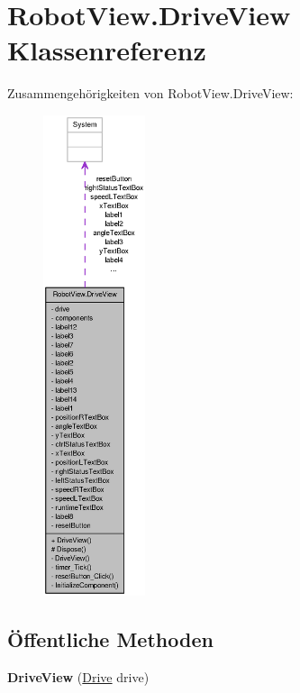 \hypertarget{class_robot_view_1_1_drive_view}{
\section{RobotView.DriveView Klassenreferenz}
\label{class_robot_view_1_1_drive_view}
}


Zusammengehörigkeiten von RobotView.DriveView:\nopagebreak
\begin{figure}[H]
\begin{center}
\leavevmode
\includegraphics[height=400pt]{class_robot_view_1_1_drive_view__coll__graph}
\end{center}
\end{figure}
\subsection*{Öffentliche Methoden}
\begin{DoxyCompactItemize}
\item 
\hypertarget{class_robot_view_1_1_drive_view_a6f487f04d70fbb0ddaa2f5653d917a1c}{
{\bfseries DriveView} (\hyperlink{class_robot_ctrl_1_1_drive}{Drive} drive)}
\label{class_robot_view_1_1_drive_view_a6f487f04d70fbb0ddaa2f5653d917a1c}

\end{DoxyCompactItemize}
